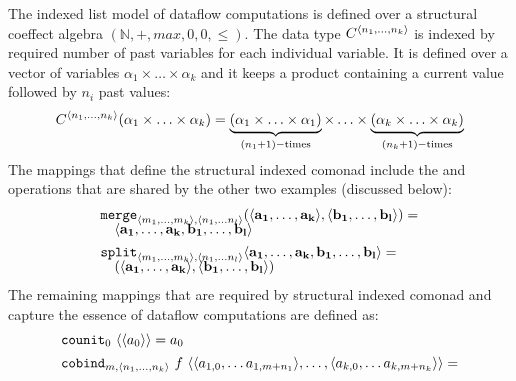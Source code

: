 \begin{example}
\label{thm:struct-dfl}
The indexed list model of dataflow computations is defined over a structural coeffect
algebra $(\mathbb{N}, +, \mathit{max}, 0, 0, \leq)$. The data type $\ctyp{\langle n_1, \ldots, n_k\rangle}$
is indexed by required number of past variables for each individual variable. It is defined
over a vector of variables $\alpha_1 \times \ldots \times \alpha_k$ and it keeps a product
containing a current value followed by $n_i$ past values:
%
\begin{equation*}
C^{\langle n_1, \ldots, n_k\rangle}(\alpha_1 \times \ldots \times \alpha_k) =
\underbrace{(\alpha_1 \times \ldots \times \alpha_1)}_{(n_1+1)-\textnormal{times}} \times \ldots \times
  \underbrace{(\alpha_k \times \ldots \times \alpha_k)}_{(n_k+1)-\textnormal{times}}
\end{equation*}
%
The mappings that define the structural indexed comonad include the  and 
operations that are shared by the other two examples (discussed below):
%
\begin{equation*}
\begin{array}{l}
\textnormal{\ttfamily merge}_{\langle m_1, \ldots, m_k \rangle, \langle n_1, \ldots n_l \rangle}
  (\langle \mathbf{a_1}, \ldots, \mathbf{a_k} \rangle, \langle \mathbf{b_1}, \ldots, \mathbf{b_l}\rangle) = \\[-0.25em]
\quad \langle \mathbf{a_1}, \ldots, \mathbf{a_k}, \mathbf{b_1}, \ldots, \mathbf{b_l}\rangle
\\[0.45em]
\textnormal{\ttfamily split}_{\langle m_1, \ldots, m_k \rangle, \langle n_1, \ldots n_l \rangle}
   \langle \mathbf{a_1}, \ldots, \mathbf{a_k}, \mathbf{b_1}, \ldots, \mathbf{b_l}\rangle = \\[-0.25em]
\quad (\langle \mathbf{a_1}, \ldots, \mathbf{a_k} \rangle, \langle \mathbf{b_1}, \ldots, \mathbf{b_l}\rangle)
\end{array}
\end{equation*}
%
The remaining mappings that are required by structural indexed comonad and capture the
essence of dataflow computations are defined as:
%
\begin{equation*}
\begin{array}{l}
\textnormal{\ttfamily counit}_{0}~\langle \langle a_0 \rangle \rangle = a_0
\\[0.45em]
\textnormal{\ttfamily cobind}_{m, \langle n_1, \ldots, n_k \rangle}~f~
  \langle \langle a_{1,0}, \ldots a_{1,m+{n_1}} \rangle, \ldots, \langle a_{k,0}, \ldots a_{k,m+{n_k}} \rangle \rangle = \\[-0.25em]

\end{array}
\end{equation*}
\end{example}
